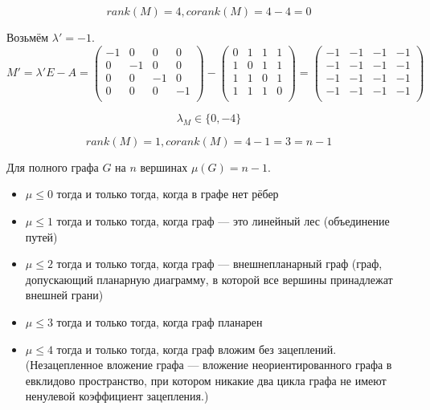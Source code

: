 \begin{example}
$$rank(M) = 4, corank(M) = 4 - 4 = 0$$

Возьмём $\lambda' = -1$.
$$
M' = \lambda'E - A =
\left({
  \begin{array}{rrrrrr}
  -1 & 0 & 0 & 0 \\
  0 & -1 & 0 & 0 \\
  0 & 0 & -1 & 0 \\
  0 & 0 & 0 & -1 \\
  \end{array}
  }\right)
  -
  \left({
  \begin{array}{rrrrrr}
  0 & 1 & 1 & 1 \\
  1 & 0 & 1 & 1 \\
  1 & 1 & 0 & 1 \\
  1 & 1 & 1 & 0 \\
  \end{array}
  }\right)
  =
  \left({
  \begin{array}{rrrrrr}
  -1 & -1 & -1 & -1 \\
  -1 & -1 & -1 & -1 \\
  -1 & -1 & -1 & -1 \\
  -1 & -1 & -1 & -1 \\
  \end{array}
  }\right)
$$

$$\lambda_M \in \{0,-4\}$$

$$rank(M) = 1, corank(M) = 4 - 1 = 3 = n - 1$$

\end{example}

Для полного графа $G$ на $n$ вершинах $\mu(G) = n - 1$.

\begin{itemize}
  \item $\mu \leq 0$ тогда и только тогда, когда в графе нет рёбер
  \item $\mu \leq 1$ тогда и только тогда, когда граф --- это линейный лес (объединение путей)
  \item $\mu \leq 2$ тогда и только тогда, когда граф --- внешнепланарный граф (граф, допускающий планарную диаграмму, в которой все вершины принадлежат внешней грани)
  \item $\mu \leq 3$ тогда и только тогда, когда граф планарен
  \item $\mu \leq 4$ тогда и только тогда, когда граф вложим без зацеплений. (Незацепленное вложение графа --- вложение неориентированного графа в евклидово пространство, при котором никакие два цикла графа не имеют ненулевой коэффициент зацепления.)
\end{itemize}

